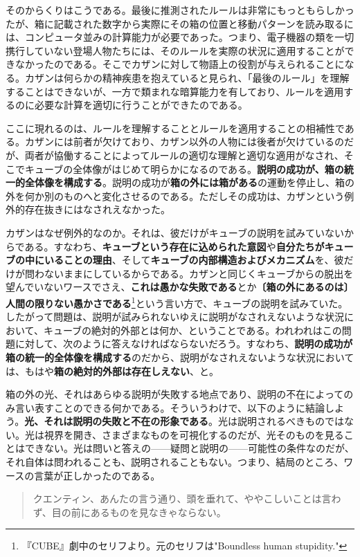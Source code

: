 \documentclass[a4paper]{jsarticle}
\begin{document}
そのからくりはこうである。最後に推測されたルールは非常にもっともらしかったが、箱に記載された数字から実際にその箱の位置と移動パターンを読み取るには、コンピュータ並みの計算能力が必要であった。つまり、電子機器の類を一切携行していない登場人物たちには、そのルールを実際の状況に適用することができなかったのである。そこでカザンに対して物語上の役割が与えられることになる。カザンは何らかの精神疾患を抱えていると見られ、「最後のルール」を理解することはできないが、一方で類まれな暗算能力を有しており、ルールを適用するのに必要な計算を適切に行うことができたのである。

ここに現れるのは、ルールを理解することとルールを適用することの相補性である。カザンには前者が欠けており、カザン以外の人物には後者が欠けているのだが、両者が協働することによってルールの適切な理解と適切な適用がなされ、そこでキューブの全体像がはじめて明らかになるのである。\textbf{説明の成功が、箱の統一的全体像を構成する}。説明の成功が\textbf{箱の外には箱がある}の運動を停止し、箱の外を何か別のものへと変化させるのである。ただしその成功は、カザンという例外的存在抜きにはなされえなかった。

カザンはなぜ例外的なのか。それは、彼だけがキューブの説明を試みていないからである。すなわち、\textbf{キューブという存在に込められた意図}や\textbf{自分たちがキューブの中にいることの理由}、そして\textbf{キューブの内部構造およびメカニズム}を、彼だけが問わないままにしているからである。カザンと同じくキューブからの脱出を望んでいないワースでさえ、\textbf{これは愚かな失敗である}とか\textbf{〔箱の外にあるのは〕人間の限りない愚かさである}\footnote{『CUBE』劇中のセリフより。元のセリフは"Boundless human stupidity."}という言い方で、キューブの説明を試みていた。したがって問題は、説明が試みられないゆえに説明がなされえないような状況において、キューブの絶対的外部とは何か、ということである。われわれはこの問題に対して、次のように答えなければならないだろう。すなわち、\textbf{説明の成功が箱の統一的全体像を構成する}のだから、説明がなされえないような状況においては、もはや\textbf{箱の絶対的外部は存在しえない}、と。

箱の外の光、それはあらゆる説明が失敗する地点であり、説明の不在によってのみ言い表すことのできる何かである。そういうわけで、以下のように結論しよう。\textbf{光、それは説明の失敗と不在の形象である}。光は説明されるべきものではない。光は視界を開き、さまざまなものを可視化するのだが、光そのものを見ることはできない。光は問いと答えの------疑問と説明の------可能性の条件なのだが、それ自体は問われることも、説明されることもない。つまり、結局のところ、ワースの言葉が正しかったのである。

\begin{quote}
クエンティン、あんたの言う通り、頭を垂れて、ややこしいことは言わず、目の前にあるものを見なきゃならない。
\end{quote}
\end{document}
